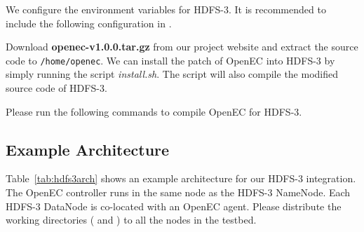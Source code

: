 \documentclass[letterpaper,12pt]{article}
\newcommand{\openec}{{\sf\small OpenEC}\xspace}
\begin{document}
We configure the environment variables for HDFS-3. It is recommended to
include the following configuration in .

\begin{center}
\noindent{}
\end{center}

Download {\bf openec-v1.0.0.tar.gz} from our project website and extract the
source code to {\tt /home/openec}.  We can install the patch of \openec into
HDFS-3 by simply running the script {\sl install.sh}.  The script will also
compile the modified source code of HDFS-3.

\begin{center}
\noindent{}
\end{center}

Please run the following commands to compile \openec for HDFS-3.

\begin{center}
\noindent{}
\end{center}

\subsection{Example Architecture}

Table~\ref{tab:hdfs3arch} shows an example architecture for our HDFS-3
integration.  The \openec controller runs in the same node as the HDFS-3
NameNode.  Each HDFS-3 DataNode is co-located with an \openec agent. Please
distribute the working directories ( and
) to all the nodes in the testbed. 
\end{document}
